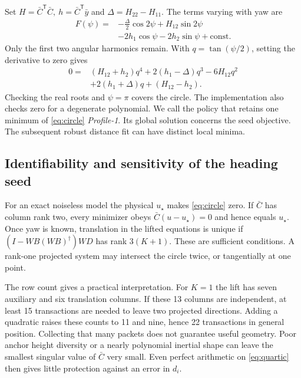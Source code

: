 \documentclass{IEEEtaes}
\newcommand{\trans}{^{\mathsf T}}
\begin{document}
Set \(H=\bar C\trans\bar C,\ h=\bar C\trans\bar y\) and \(\Delta=H_{22}-H_{11}\). The terms varying with yaw are
\begin{align}
 F(\psi)={}&-\tfrac{\Delta}{2}\cos2\psi+H_{12}\sin2\psi \nonumber\\
           &-2h_1\cos\psi-2h_2\sin\psi+\mathrm{const}. \label{eq:harmonic}
\end{align}
Only the first two angular harmonics remain. With \(q=\tan(\psi/2)\), setting the derivative to zero gives
\begin{align}
 0={}&(H_{12}+h_2)q^4+2(h_1-\Delta)q^3-6H_{12}q^2 \nonumber\\
     &+2(h_1+\Delta)q+(H_{12}-h_2). \label{eq:quartic}
\end{align}
Checking the real roots and \(\psi=\pi\) covers the circle. The implementation also checks zero for a degenerate polynomial. We call the policy that retains one minimum of \eqref{eq:circle} \emph{Profile-1}. Its global solution concerns the seed objective. The subsequent robust distance fit can have distinct local minima.

\subsection{Identifiability and sensitivity of the heading seed}
For an exact noiseless model the physical \(u_\star\) makes \eqref{eq:circle} zero. If \(\bar C\) has column rank two, every minimizer obeys \(\bar C(u-u_\star)=0\) and hence equals \(u_\star\). Once yaw is known, translation in the lifted equations is unique if \((I-WB(WB)^\dagger)WD\) has rank \(3(K+1)\). These are sufficient conditions. A rank-one projected system may intersect the circle twice, or tangentially at one point.

The row count gives a practical interpretation. For \(K=1\) the lift has seven auxiliary and six translation columns. If these 13 columns are independent, at least 15 transactions are needed to leave two projected directions. Adding a quadratic raises these counts to 11 and nine, hence 22 transactions in general position. Collecting that many packets does not guarantee useful geometry. Poor anchor height diversity or a nearly polynomial inertial shape can leave the smallest singular value of \(\bar C\) very small. Even perfect arithmetic on \eqref{eq:quartic} then gives little protection against an error in \(d_i\).
\end{document}
